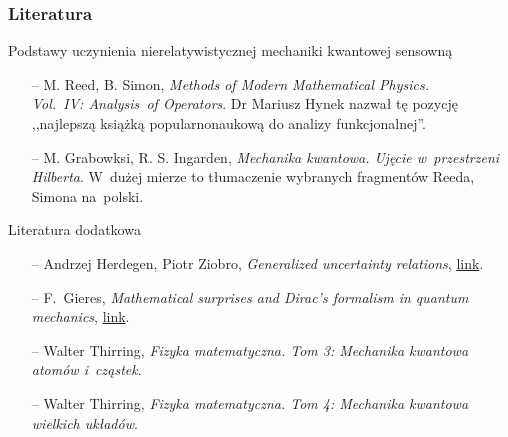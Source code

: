 \documentclass{beamer} \mode<presentation>
\newcommand{\colorlink}[1]{\href{#1}{\color{orange} link}}
\begin{document}
\begin{frame}
  \frametitle{Literatura}

  \begin{block}{Podstawy uczynienia nierelatywistycznej mechaniki
      kwantowej sensowną}
    \begin{itemize}
    \item[--] M. Reed, B. Simon, \emph{Methods of Modern Mathematical
        Physics. \\
        Vol.~IV: Analysis~of Operators}. Dr Mariusz Hynek nazwał tę
      pozycję ,,najlepszą książką popularnonaukową do analizy
      funkcjonalnej''.
    \item[--] M. Grabowksi, R. S. Ingarden, \emph{Mechanika kwantowa.
        Ujęcie w~przestrzeni Hilberta}. W~dużej mierze to tłumaczenie
      wybranych fragmentów Reeda, Simona na~polski.
    \end{itemize}
  \end{block}

  \begin{block}{Literatura dodatkowa}
    \begin{itemize}
    \item[--] Andrzej Herdegen, Piotr Ziobro, \emph{Generalized
        uncertainty relations},
      \colorlink{https://arxiv.org/abs/1511.06589}.
    \item[--] F.~Gieres, \emph{Mathematical surprises and Dirac's
        formalism in quantum mechanics},
      \colorlink{https://arxiv.org/abs/quant-ph/9907069}.
    \item[--] Walter Thirring, \emph{Fizyka matematyczna. Tom 3:
        Mechanika kwantowa atomów i~cząstek}.
    \item[--] Walter Thirring, \emph{Fizyka matematyczna. Tom 4:
        Mechanika kwantowa wielkich układów}.
    \end{itemize}
  \end{block}
  
\end{frame}
\end{document}
